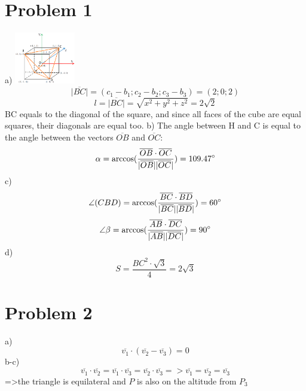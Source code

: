 \documentclass[11pt]{article}
\begin{document}
    \section{Problem 1}
    a)
    \includegraphics[width=100px]{cube}
    \[
        \overline{|BC|}=(c_{1}-b_{1};c_{2}-b_{2};c_{3}-b_{3})=(2;0;2)
    \]
    \[
        l=\overline{|BC|}=\sqrt{x^2 + y^2 + z^2}=2\sqrt{2}
    \]
    BC equals to the diagonal of the square, and since all faces of the cube are equal squares, their diagonals are equal too.\newline
    b)
    The angle between H and C is equal to the angle between the vectors $\overline{OB}$ and $\overline{OC}$:
    \[
        \alpha=\arccos(\frac{\overline{OB}\cdot\overline{OC}}{|\overline{OB}| |\overline{OC}|})=109.47\degree
    \]
    c)
    \[
        \angle (CBD) = \arccos(\frac {\overline{BC}\cdot \overline{BD}}{|\overline{BC}| |\overline{BD}|}) = 60\degree
    \]
    \[
        \angle \beta = \arccos(\frac {\overline{AB}\cdot \overline{DC}}{|\overline{AB}| |\overline{DC}|}) = 90 \degree
    \]
    d)
    \[
        S = \frac{BC^2\cdot\sqrt{3}}{4} = 2\sqrt{3}
    \]


    \section{Problem 2}

    a)
    \[
        \overline{v_1}\cdot(\overline{v_2}-\overline{v_3})=0
    \]
    b-c)
    \[
        \overline{v_1}\cdot\overline{v_2}=\overline{v_1}\cdot\overline{v_3}=\overline{v_2}\cdot\overline{v_3}
    => \overline{v_1}=\overline{v_2}=\overline{v_3} \] =\textgreater the triangle is equilateral and $P$ is also on the altitude from $P_3$
\end{document}
